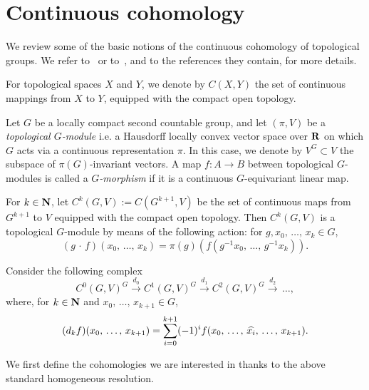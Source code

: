 \documentclass[11pt]{article}
\theoremstyle{definition}
\numberwithin{equation}{section}
\numberwithin{figure}{section}
\numberwithin{table}{section}
\renewcommand*{\hat}[1]{\mathchoice{\widehat{#1}}{\widehat{#1}}{\oldhat{#1}}{\oldhat{#1}}}
\begin{document}
\section{Continuous cohomology}\label{2}

We review some of the basic notions of the continuous cohomology of topological groups. We refer to~\cite[Chapter~IX]{BW} or to~\cite{Gui}, and to the references they contain, for more details.

For topological spaces $X$ and $Y$, we denote by $C(X,Y)$ the set of continuous mappings from $X$ to $Y$, equipped with the compact open topology.

Let $G$ be a locally compact second countable group, and let $(\pi, V)$ be a \emph{topological $G$-module} i.e. a Hausdorff locally convex vector space over ${\bf R}$ on which $G$ acts via a continuous representation $\pi$. In this case, we denote by $V^G \subset V$ the subspace of $\pi(G)$-invariant vectors. A map $f: A \to B$ between topological $G$-modules is called a \emph{$G$-morphism} if it is a continuous $G$-equivariant linear map.


For $k \in {\bf N}$, let $C^k (G, V):= C(G^{k+1}, V)$ be the set of continuous maps from $G^{k+1}$ to $V$ equipped with the compact open topology. Then $C^k (G,V)$ is a topological $G$-module by means of the following action: for $g, x_0,\,\dots,\,x_k \in G$,
\[
(g\,\cdot\,f) (x_0,\,\dots,\,x_k) = \pi(g) \left(f\left(g ^{-1} x_0,\,\dots,\,g^{-1} x_k\right)\right).
\]

Consider the following complex
\[
C^0(G,V)^G \stackrel{d_0}{\to} C^1(G,V)^G \stackrel{d_1}{\to} C^2(G,V)^G \stackrel{d_2}{\to}\,\dots,
\]
where, for $k \in {\bf N}$ and $x_0,\,\dots,\,x_{k+1} \in G$,
\begin{equation}\label{differential}
(d _k f)(x_0,\,\dots,\,x_{k+1}) = \sum _{i =0} ^{k+1} (-1)^{i} f(x_0,\,\dots,\,\hat{x_i},\,\dots,\,x_{k+1}).
\end{equation}

We first define the cohomologies we are interested in thanks to the above standard homogeneous resolution.
\end{document}
